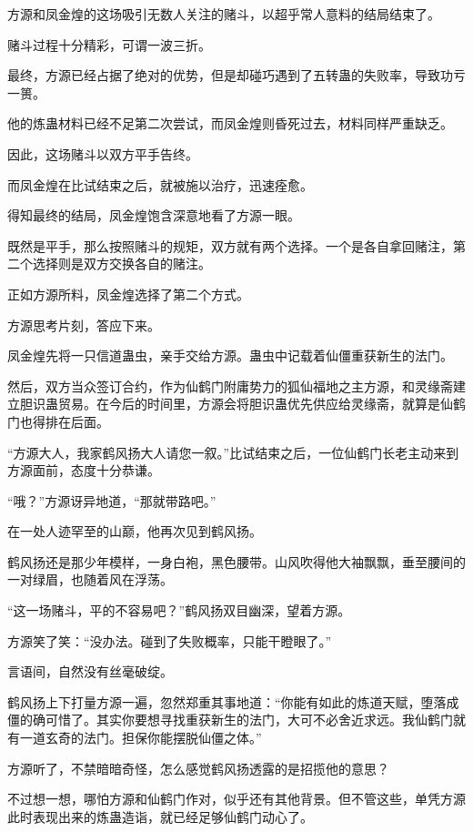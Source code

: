 
\begin{this_body}

方源和凤金煌的这场吸引无数人关注的赌斗，以超乎常人意料的结局结束了。

赌斗过程十分精彩，可谓一波三折。

最终，方源已经占据了绝对的优势，但是却碰巧遇到了五转蛊的失败率，导致功亏一篑。

他的炼蛊材料已经不足第二次尝试，而凤金煌则昏死过去，材料同样严重缺乏。

因此，这场赌斗以双方平手告终。

而凤金煌在比试结束之后，就被施以治疗，迅速痊愈。

得知最终的结局，凤金煌饱含深意地看了方源一眼。

既然是平手，那么按照赌斗的规矩，双方就有两个选择。一个是各自拿回赌注，第二个选择则是双方交换各自的赌注。

正如方源所料，凤金煌选择了第二个方式。

方源思考片刻，答应下来。

凤金煌先将一只信道蛊虫，亲手交给方源。蛊虫中记载着仙僵重获新生的法门。

然后，双方当众签订合约，作为仙鹤门附庸势力的狐仙福地之主方源，和灵缘斋建立胆识蛊贸易。在今后的时间里，方源会将胆识蛊优先供应给灵缘斋，就算是仙鹤门也得排在后面。

“方源大人，我家鹤风扬大人请您一叙。”比试结束之后，一位仙鹤门长老主动来到方源面前，态度十分恭谦。

“哦？”方源讶异地道，“那就带路吧。”

在一处人迹罕至的山巅，他再次见到鹤风扬。

鹤风扬还是那少年模样，一身白袍，黑色腰带。山风吹得他大袖飘飘，垂至腰间的一对绿眉，也随着风在浮荡。

“这一场赌斗，平的不容易吧？”鹤风扬双目幽深，望着方源。

方源笑了笑：“没办法。碰到了失败概率，只能干瞪眼了。”

言语间，自然没有丝毫破绽。

鹤风扬上下打量方源一遍，忽然郑重其事地道：“你能有如此的炼道天赋，堕落成僵的确可惜了。其实你要想寻找重获新生的法门，大可不必舍近求远。我仙鹤门就有一道玄奇的法门。担保你能摆脱仙僵之体。”

方源听了，不禁暗暗奇怪，怎么感觉鹤风扬透露的是招揽他的意思？

不过想一想，哪怕方源和仙鹤门作对，似乎还有其他背景。但不管这些，单凭方源此时表现出来的炼蛊造诣，就已经足够仙鹤门动心了。


\end{this_body}
